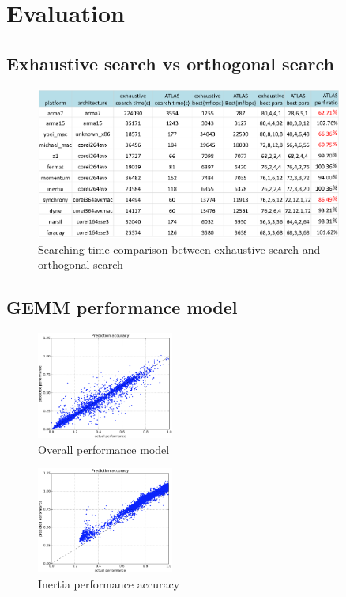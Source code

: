 \section{Evaluation}
\label{sec:evaluation}

  \subsection{Exhaustive search vs \atl orthogonal search}
  \label{sec:exhaustiveVSorthogonal}

  \begin{figure}[tbhp]
    \centering
    \includegraphics[width=0.9\textwidth]{images/exhaustiveVsorthogonal.png}
    \caption{Searching time comparison between exhaustive search and \atl orthogonal search}
    \label{fig:exhaustiveVsorthogonal}
  \end{figure}

  \subsection{GEMM performance model}
  \label{sec:GEMMperf}
  \begin{figure}[tbhp]
    \centering
    \includegraphics[width=0.4\textwidth]{images/overall_model.png}
    \caption{Overall performance model}
    \label{fig:overall_model}
  \end{figure}

  \begin{figure}[tbhp]
    \centering
    \includegraphics[width=0.4\textwidth]{images/inertia_perf.png}
    \caption{Inertia performance accuracy}
    \label{fig:inertia_perf}
  \end{figure}


